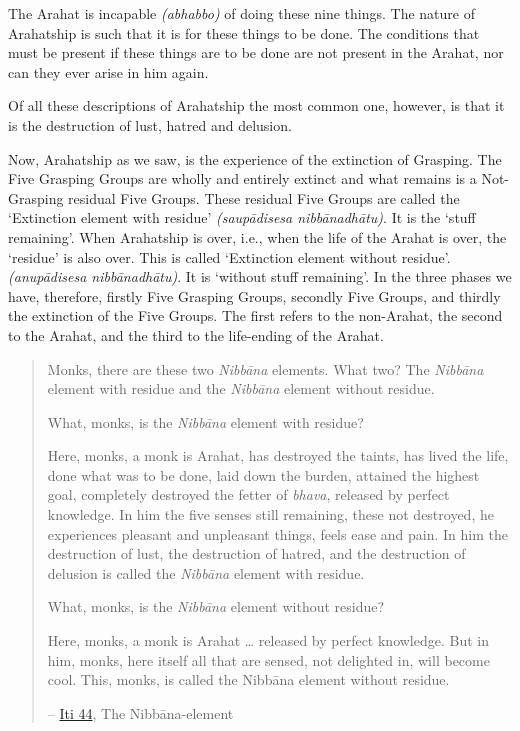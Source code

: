The Arahat is incapable \emph{(abhabbo)} of doing these nine things. The nature of Arahatship is such that it is  for these things to be done. The conditions that must be present if these things are to be done are not present in the Arahat, nor can they ever arise in him again.

Of all these descriptions of Arahatship the most common one, however, is that it is the destruction of lust, hatred and delusion.

\protect\hypertarget{remainder}{}{}Now, Arahatship as we saw, is the experience of the extinction of Grasping. The Five Grasping Groups are wholly and entirely extinct and what remains is a Not-Grasping residual Five Groups. These residual Five Groups are called the `Extinction element with residue' \emph{(saupādisesa nibbānadhātu)}. It is the `stuff remaining'. When Arahatship is over, i.e., when the life of the Arahat is over, the `residue' is also over. This is called `Extinction element without residue'. \emph{(anupādisesa nibbānadhātu)}. It is `without stuff remaining'. In the three phases we have, therefore, firstly Five Grasping Groups, secondly Five Groups, and thirdly the extinction of the Five Groups. The first refers to the non-Arahat, the second to the Arahat, and the third to the life-ending of the Arahat.

\begin{quote}
Monks, there are these two \emph{Nibbāna} elements. What two? The \emph{Nibbāna} element with residue and the \emph{Nibbāna} element without residue.

What, monks, is the \emph{Nibbāna} element with residue?

Here, monks, a monk is Arahat, has destroyed the taints, has lived the life, done what was to be done, laid down the burden, attained the highest goal, completely destroyed the fetter of \emph{bhava}, released by perfect knowledge. In him the five senses still remaining, these not destroyed, he experiences pleasant and unpleasant things, feels ease and pain. In him the destruction of lust, the destruction of hatred, and the destruction of delusion is called the \emph{Nibbāna} element with residue.

What, monks, is the \emph{Nibbāna} element without residue?

Here, monks, a monk is Arahat \ldots\hspace{0pt} released by perfect knowledge. But in him, monks, here itself all that are sensed, not delighted in, will become cool. This, monks, is called the Nibbāna element without residue.

 -- \href{https://suttacentral.net/iti44/en/ireland}{Iti 44}, The Nibbāna-element
\end{quote}

